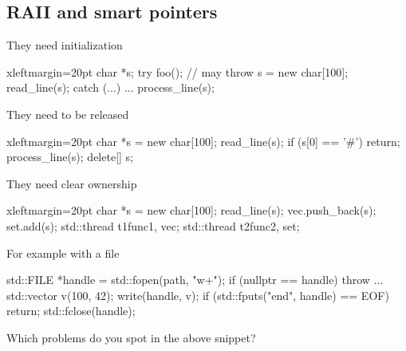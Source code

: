 \subsection[RAII]{RAII and smart pointers}

\begin{frame}[fragile]
  \begin{exampleblock}{They need initialization
      \hfill {}}
    \begin{cppcode*}{xleftmargin=20pt}
      char *s;
      try {
        foo(); // may throw
        s = new char[100];
        read_line(s);
      } catch (...) { ... }
      process_line(s);
    \end{cppcode*}
  \end{exampleblock}
  \pause
  \pause
  \vspace{-2cm}
  \begin{exampleblock}{They need to be released
      \hfill {}}
    \begin{cppcode*}{xleftmargin=20pt}
      char *s = new char[100];
      read_line(s);
      if (s[0] == '#') return;
      process_line(s);
      delete[] s;
    \end{cppcode*}
  \end{exampleblock}
  \pause
  \pause
  \vspace{-2cm}
  \begin{exampleblock}{They need clear ownership
      \hfill {}}
    \begin{cppcode*}{xleftmargin=20pt}
      char *s = new char[100];
      read_line(s);
      vec.push_back(s);
      set.add(s);
      std::thread t1{func1, vec};
      std::thread t2{func2, set};
    \end{cppcode*}
  \end{exampleblock}
\end{frame}

\begin{frame}[fragile]
  \begin{exampleblock}{For example with a file}
    \begin{cppcode*}{}
      std::FILE *handle = std::fopen(path, "w+");
      if (nullptr == handle) { throw ... }
      std::vector v(100, 42);
      write(handle, v);
      if (std::fputs("end", handle) == EOF) {
        return;
      }
      std::fclose(handle);
    \end{cppcode*}
  \end{exampleblock}
  \begin{block}{}
    Which problems do you spot in the above snippet?
  \end{block}
\end{frame}

